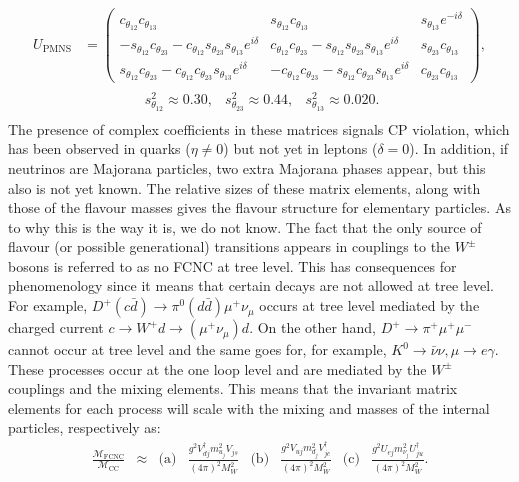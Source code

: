 \documentclass[a4paper, 11pt, normalem]{report}
\begin{document}
\begin{align}
    \begin{split}
        U_{\text{PMNS}} &= \begin{pmatrix} c_{\theta_{12}}c_{\theta_{13}} & s_{\theta_{12}}c_{\theta_{13}} & s_{\theta_{13}}e^{-i\delta} \\ -s_{\theta_{12}}c_{\theta_{23}}-c_{\theta_{12}}s_{\theta_{23}}s_{\theta_{13}}e^{i\delta} & c_{\theta_{12}}c_{\theta_{23}}-s_{\theta_{12}}s_{\theta_{23}}s_{\theta_{13}}e^{i\delta} & s_{\theta_{23}}c_{\theta_{13}} \\ s_{\theta_{12}}c_{\theta_{23}}-c_{\theta_{12}}c_{\theta_{23}}s_{\theta_{13}}e^{i\delta} & -c_{\theta_{12}}c_{\theta_{23}}-s_{\theta_{12}}c_{\theta_{23}}s_{\theta_{13}}e^{i\delta} & c_{\theta_{23}}c_{\theta_{13}} \end{pmatrix}, \\
                        &\qquad\qquad \begin{matrix} s_{\theta_{12}}^2 \approx 0.30, & s_{\theta_{23}}^2 \approx 0.44, & s_{\theta_{13}}^2 \approx 0.020. \end{matrix}
    \end{split}
\end{align}
The presence of complex coefficients in these matrices signals CP violation, which has been observed in quarks ($\eta\neq0$) but not yet in leptons ($\delta=0$).
In addition, if neutrinos are Majorana particles, two extra Majorana phases appear, but this also is not yet known.
The relative sizes of these matrix elements, along with those of the flavour masses gives the flavour structure for elementary particles.
As to why this is the way it is, we do not know.
The fact that the only source of flavour (or possible generational) transitions appears in couplings to the $W^\pm$ bosons is referred to as no FCNC at tree level.
This has consequences for phenomenology since it means that certain decays are not allowed at tree level.
For example, $D^+(c\bar{d})\to\pi^0(d\bar{d})\mu^+\nu_\mu$ occurs at tree level mediated by the charged current $c\to W^+d\to(\mu^+\nu_\mu)d$.
On the other hand, $D^+\to\pi^+\mu^+\mu^-$ cannot occur at tree level and the same goes for, for example, $K^0\to\bar{\nu}\nu,\mu\to e\gamma$.
These processes occur at the one loop level and are mediated by the $W^\pm$ couplings and the mixing elements.
This means that the invariant matrix elements for each process will scale with the mixing and masses of the internal particles, respectively as:
\begin{align}
    \frac{\mathcal{M}_{\text{FCNC}}}{\mathcal{M}_{\text{CC}}}&\approx & \text{(a)}&\frac{g^2V_{dj}^\dagger m_{u_j}^2V_{js}}{(4\pi)^2M_W^2} & \text{(b)}&\frac{g^2V_{uj}m_{d_j}^2V_{jc}^\dagger}{(4\pi)^2M_W^2} & \text{(c)}&\frac{g^2U_{ej}m_{\nu_j}^2U_{ju}^\dagger}{(4\pi)^2M_W^2}.
\end{align}
\end{document}
